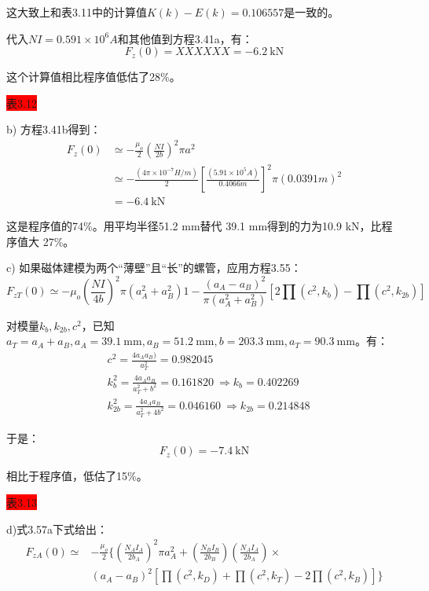 这大致上和表3.11中的计算值$K(k)−E(k)=0.106557$是一致的。

代入$NI =0.591\times 10^6 A$和其他值到方程3.41a，有：
\begin{equation*}
F_z(0)=XXXXXX=-6.2\ \mathrm{kN}
\end{equation*}

这个计算值相比程序值低估了28\%。

\colorbox{red}{表3.12}

b) 方程3.41b得到：
\begin{equation*}
\begin{split}
F_{z}(0)&\simeq-\frac{\mu_{o}}{2}(\frac{NI}{2b})^{2}\pi a^{2}\\%
&\simeq-\frac{(4\pi\times 10^{-7}H/m)}{2}[\frac{(5.91\times 10^{5}A)}{0.4066m}]^{2}\pi(0.0391m)^{2}\\
&=-6.4 \ \mathrm{kN}
\end{split}\tag{3.41b}
\end{equation*}

这是程序值的74\%。用平均半径51.2 mm替代 39.1 mm得到的力为10.9 kN，比程序值大 27\%。 

c) 如果磁体建模为两个“薄壁”且“长”的螺管，应用方程3.55：
\begin{equation*}
F_{zT}(0)\simeq-\mu_{o}(\frac{NI}{4b})^{2}\pi(a_{A}^{2}+a_{B}^{2}){1-\frac{(a_{A}-a_{B})^{2}}{\pi(a_{A}^{2}+a_{B}^{2})}[2\prod(c^{2},k_{b})-\prod(c^{2},k_{2b})]}\tag{3.55}%
\end{equation*}

对模量$k_b, k_{2b},c^2$，已知$a_T = a_A+a_B, a_A = 39.1\ \mathrm{mm}, a_B = 51.2\ \mathrm{mm}, b =203.3\ \mathrm{mm}, a_T=90.3\ \mathrm{mm}$。有：
\begin{eqnarray*}
&c^2=\frac{4a_A a_B)}{a_T^2}=0.982045\\
&k_b^2=\frac{4a_A a_B}{a_T^2+b^2}=0.161820\ \Rightarrow k_b=0.402269\\
&k_{2b}^2=\frac{4a_A a_B}{a_T^2+4b^2}=0.046160\ \Rightarrow k_{2b}=0.214848
\end{eqnarray*}

于是：
$$F_z(0)=-7.4\ \mathrm{kN}$$

相比于程序值，低估了15\%。

\colorbox{red}{表3.13}

d)式3.57a下式给出：
\begin{equation*}
\begin{split}
F_{zA}(0)\simeq&-\frac{\mu_{o}}{2}\{(\frac{N_{A}I_{A}}{2b_{A}})^{2}\pi a_{A}^{2}+(\frac{N_{B}I_{B}}{2b_{B}})(\frac{N_{A}I_{A}}{2b_{A}})\times\\
&(a_{A}-a_{B})^{2}[\prod(c^{2},k_{D})+\prod(c^{2},k_{T})-2\prod(c^{2},k_{B})]\}%
\end{split}\tag{3.57a}
\end{equation*}

